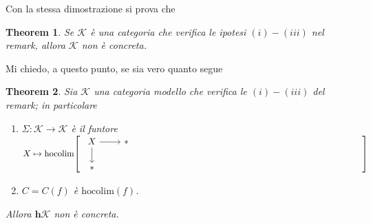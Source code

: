 \documentclass[12pt]{amsart}
\def\cate#1{\mathbf{#1}}
\newtheorem{theo}{Theorem}[section]
\newcommand\ck{\mathcal {K}}
\begin{document}
Con la stessa dimostrazione si prova che

\begin{theo}
Se $\ck$ è una categoria che verifica le ipotesi $(i)-(iii)$ nel remark, allora $\ck$ non è concreta.
\end{theo}

\hrulefill

Mi chiedo, a questo punto, se sia vero quanto segue
\begin{theo}
Sia $\ck$ una categoria modello che verifica le $(i)-(iii)$ del remark; in particolare 
\begin{enumerate}
\item $\Sigma : \ck \to \ck$ è il funtore $X \mapsto \mathrm{hocolim}\!
\left[\hskip-1em
\vcenter{%
\begin{tikzcd}
X \ar[r]\ar[d]& * \\ * & 
\end{tikzcd}%
}%
\hskip-1em\right]$
\item $C=C(f)$ è $\mathrm{hocolim}(f)$.
\end{enumerate}
Allora $\cate{h}\ck$ non è concreta.
\end{theo}
\end{document}

